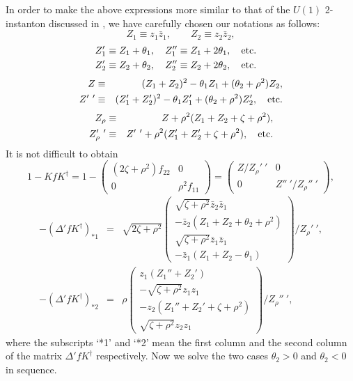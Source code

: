 \documentclass[a4paper,a4paper]{article}
\begin{document}
In order to make the above expressions more similar to that of the
$U(1)$ 2-instanton discussed in \cite{TianZhu}, we have carefully
chosen our notations as follows:
\begin{equation}
Z_1\equiv z_1\bar{z}_1,\qquad Z_2\equiv z_2\bar{z}_2,
\end{equation}
\begin{eqnarray}
&Z_1'\equiv Z_1+\theta_1,\quad Z_1''\equiv
Z_1+2\theta_1,\quad\rm{etc.}&\\
&Z_2'\equiv Z_2+\theta_2,\quad Z_2''\equiv
Z_2+2\theta_2,\quad\rm{etc.}&
\end{eqnarray}
\begin{eqnarray}
Z&\equiv&(Z_1+Z_2)^2-\theta_1 Z_1+(\theta_2+\rho^2)Z_2,\label{Z U2}\\
Z'~'&\equiv&(Z_1'+Z_2')^2-\theta_1
Z_1'+(\theta_2+\rho^2)Z_2',\quad\rm{etc.}
\end{eqnarray}
\begin{eqnarray}
Z_\rho&\equiv&Z+\rho^2(Z_1+Z_2+\zeta+\rho^2),\\
Z_\rho'~'&\equiv&Z'~'+\rho^2(Z_1'+Z_2'+\zeta+\rho^2),\quad\rm{etc.}
\end{eqnarray}
It is not difficult to obtain
\begin{equation}
1-KfK^\dag=1-\left(\begin{array}{cc} (2\zeta+\rho^2)f_{22} & 0 \\
0 & \rho^2 f_{11} \end{array}\right)=\left(\begin{array}{cc}
Z/Z_\rho'~' & 0 \\
0 & Z''~'/Z_\rho''~' \end{array}\right),
\end{equation}
\begin{eqnarray}
-(\Delta'fK^\dag)_{*1}&=&\sqrt{2\zeta+\rho^2}
\left(\begin{array}{c} \sqrt{\zeta+\rho^2}\bar{z}_2\bar{z}_1 \\
-\bar{z}_2(Z_1+Z_2+\theta_2+\rho^2) \\
\sqrt{\zeta+\rho^2}\bar{z}_1\bar{z}_1 \\
-\bar{z}_1(Z_1+Z_2-\theta_1) \end{array}\right)/Z_\rho'~',\\
-(\Delta'fK^\dag)_{*2}&=&\rho\left(\begin{array}{c} z_1(Z_1''+Z_2') \\
-\sqrt{\zeta+\rho^2}z_1 z_1 \\
-z_2(Z_1''+Z_2'+\zeta+\rho^2) \\
\sqrt{\zeta+\rho^2}z_2 z_1
\end{array}\right)/Z_\rho''~',
\end{eqnarray}
where the subscripts `*1' and `*2' mean the first column and the
second column of the matrix $\Delta' f K^\dag$ respectively. Now
we solve the two cases $\theta_2>0$ and $\theta_2<0$ in sequence.
\end{document}
